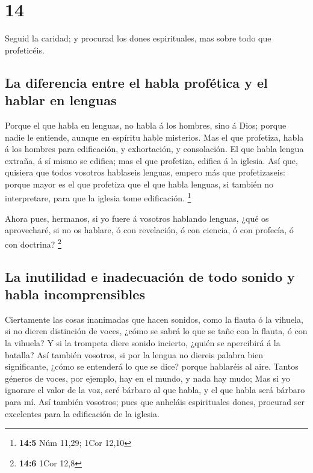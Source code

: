\hypertarget{section-13}{%
\section{14}\label{section-13}}

 Seguid la caridad; y procurad los dones espirituales, mas
sobre todo que profeticéis.

\hypertarget{la-diferencia-entre-el-habla-profuxe9tica-y-el-hablar-en-lenguas}{%
\subsection{La diferencia entre el habla profética y el hablar en
lenguas}\label{la-diferencia-entre-el-habla-profuxe9tica-y-el-hablar-en-lenguas}}

 Porque el que habla en lenguas, no habla á los hombres,
sino á Dios; porque nadie le entiende, aunque en espíritu hable
misterios.  Mas el que profetiza, habla á los hombres para
edificación, y exhortación, y consolación.  El que habla
lengua extraña, á sí mismo se edifica; mas el que profetiza, edifica á
la iglesia.  Así que, quisiera que todos vosotros hablaseis
lenguas, empero más que profetizaseis: porque mayor es el que profetiza
que el que habla lenguas, si también no interpretare, para que la
iglesia tome edificación. \footnote{\textbf{14:5} Núm 11,29; 1Cor 12,10}

 Ahora pues, hermanos, si yo fuere á vosotros hablando
lenguas, ¿qué os aprovecharé, si no os hablare, ó con revelación, ó con
ciencia, ó con profecía, ó con doctrina? \footnote{\textbf{14:6} 1Cor
  12,8}

\hypertarget{la-inutilidad-e-inadecuaciuxf3n-de-todo-sonido-y-habla-incomprensibles}{%
\subsection{La inutilidad e inadecuación de todo sonido y habla
incomprensibles}\label{la-inutilidad-e-inadecuaciuxf3n-de-todo-sonido-y-habla-incomprensibles}}

 Ciertamente las cosas inanimadas que hacen sonidos, como la
flauta ó la vihuela, si no dieren distinción de voces, ¿cómo se sabrá lo
que se tañe con la flauta, ó con la vihuela?  Y si la
trompeta diere sonido incierto, ¿quién se apercibirá á la batalla?
 Así también vosotros, si por la lengua no diereis palabra
bien significante, ¿cómo se entenderá lo que se dice? porque hablaréis
al aire.  Tantos géneros de voces, por ejemplo, hay en el
mundo, y nada hay mudo;  Mas si yo ignorare el valor de la
voz, seré bárbaro al que habla, y el que habla será bárbaro para mí.
 Así también vosotros; pues que anheláis espirituales
dones, procurad ser excelentes para la edificación de la iglesia.

